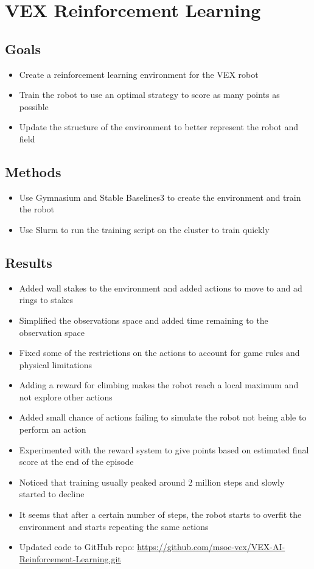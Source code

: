 \section{VEX Reinforcement Learning}

\subsection{Goals}
\begin{itemize}
    \item Create a reinforcement learning environment for the VEX robot
    \item Train the robot to use an optimal strategy to score as many points as possible
    \item Update the structure of the environment to better represent the robot and field
\end{itemize}

\subsection{Methods}
\begin{itemize}
    \item Use Gymnasium and Stable Baselines3 to create the environment and train the robot
    \item Use Slurm to run the training script on the cluster to train quickly
\end{itemize}

\subsection{Results}
\begin{itemize}
    \item Added wall stakes to the environment and added actions to move to and ad rings to stakes
    \item Simplified the observations space and added time remaining to the observation space
    \item Fixed some of the restrictions on the actions to account for game rules and physical limitations
    \item Adding a reward for climbing makes the robot reach a local maximum and not explore other actions
    \item Added small chance of actions failing to simulate the robot not being able to perform an action
    \item Experimented with the reward system to give points based on estimated final score at the end of the episode
    \item Noticed that training usually peaked around 2 million steps and slowly started to decline
    \item It seems that after a certain number of steps, the robot starts to overfit the environment and starts repeating the same actions
    \item Updated code to GitHub repo: \href{https://github.com/msoe-vex/VEX-AI-Reinforcement-Learning.git}{https://github.com/msoe-vex/VEX-AI-Reinforcement-Learning.git}
\end{itemize}

